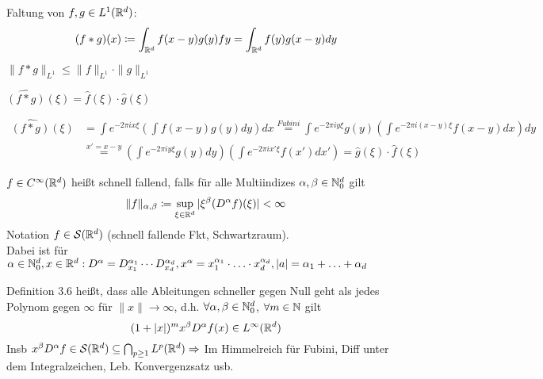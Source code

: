 \begin{definition} 
	Faltung von $f, g \in L^{1}(\mathbb{R}^{d})$:
	\[ (f \ast g)(x) \coloneqq \int_{\mathbb{R}^{d}} f(x-y)g(y) fy = \int_{\mathbb{R}^{d}} f(y)g(x-y) dy \]
\end{definition}


\begin{bemerkungnbr*}
	$\| f \ast g \|_{L^{1}} \leq \| f \|_{L^{1}} \cdot \| g \|_{L^{1}}$	
\end{bemerkungnbr*}


\begin{propnbr}
	$\widehat{(f \ast g)}(\xi) = \hat{f}(\xi) \cdot \hat{g}(\xi)$
\end{propnbr}

\begin{beweis}
	\begin{align*}
		\widehat{(f \ast g)}(\xi) & = \int e^{-2\pi i x \xi} \left( \int f(x-y)g(y) dy \right) dx \overset{Fubini}{=} \int e^{-2 \pi i y \xi} g(y) \left( \int e^{-2\pi i (x-y)\xi} f(x-y) dx \right) dy \\
			& \overset{x'=x-y}{=} \left( \int e^{-2\pi i y\xi} g(y) dy \right) \left( \int e^{-2\pi i x' \xi} f(x')dx' \right) = \hat{g}(\xi) \cdot \hat{f}(\xi)
	\end{align*}
\end{beweis}


\begin{definition}  
	$f \in C^{\infty}(\mathbb{R}^{d})$ hei{\ss}t schnell fallend, falls für alle Multiindizes $\alpha, \beta \in \mathbb{N}^{d}_{0}$ gilt
	\[ \| f \|_{\alpha, \beta} \coloneqq \sup_{\xi \in \mathbb{R}^{d}} | \xi^{\beta} (D^{\alpha}f)(\xi)| < \infty \]
	Notation $f \in \mathcal{S}(\mathbb{R}^{d})$ (schnell fallende Fkt, Schwartzraum). \\
	Dabei ist für $\alpha \in \mathbb{N}_{0}^{d}, x \in \mathbb{R}^{d}: D^{\alpha} = D_{x_{1}}^{\alpha_{1}} \cdots D_{x_{d}}^{\alpha_{d}}, x^{\alpha} = x_{1}^{\alpha_{1}} \cdot \dotsc \cdot x_{d}^{\alpha_{d}}, |a| = \alpha_{1} + \dotsc + \alpha_{d}$
\end{definition}


\begin{bemerkung*}
	Definition 3.6 hei{\ss}t, dass alle Ableitungen schneller gegen Null geht als jedes Polynom gegen $\infty$ für $\|x\| \rightarrow \infty$, d.h. $\forall \alpha, \beta \in \mathbb{N}_{0}^{d}$, $\forall m \in \mathbb{N}$ gilt
	\[ (1 + |x|)^{m} x^{\beta} D^{\alpha} f(x) \in L^{\infty}(\mathbb{R}^{d}) \]
	Insb $x^{\beta} D^{\alpha} f \in \mathcal{S}(\mathbb{R}^{d}) \subseteq \bigcap_{p \geq 1} L^{p}(\mathbb{R}^{d}) \Rightarrow$ Im Himmelreich für Fubini, Diff unter dem Integralzeichen, Leb. Konvergenzsatz usb.	
\end{bemerkung*}


